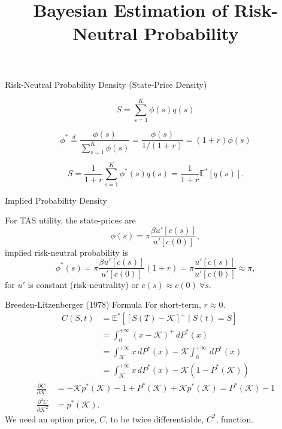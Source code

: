 \documentclass[10pt,aspectratio=43]{beamer}
\title{Bayesian Estimation of Risk-Neutral Probability}
\begin{document}
\begin{frame}[fragile]
    \titlepage
\end{frame}




\begin{frame}{ Risk-Neutral Probability Density (State-Price Density)}

    \[S=\sum_{s=1}^K\phi(s)q(s)\]

    \[\phi^*\overset{d}{=}\frac{\phi(s)}{\sum_{s=1}^K\phi(s)}=\frac{\phi(s)}{1/(1+r)}=(1+r)\phi(s)\]

    \[S=\frac{1}{1+r}\sum_{s=1}^K\phi^*(s)q(s)=\frac{1}{1+r}\mathbb{E}^*[q(s)].\]

\end{frame}
\begin{frame}{Implied  Probability Density}
 
    For TAS utility, the state-prices are 
    \[\phi(s)=\pi\frac{\beta u'[c(s)]}{u'[c(0)]},\]
    \then implied risk-neutral probability is
    \[\phi^*(s)=\pi\frac{\beta u'[c(s)]}{u'[c(0)]}(1+r)= \pi\frac{u'[c(s)]}{u'[c(0)]}\approx \pi,\]
    for $u'$ is constant (risk-neutrality) or $c(s)\approx c(0)~\forall s$.


\end{frame}

\begin{frame}{Breeden-Litzenberger (1978) Formula}
\nocite{breedenPricesStateContingentClaims1978}
For short-term, $r\approx 0$.
    \begin{align*}
        C(S,t)&=\mathbb{E}^*\left[[S(T)-\mathcal{K}]^+\mid S(t)=S\right]\\ 
        &=\int_0^{+\infty}(x-\mathcal{K})^+\,dP^*(x)\\ &=\int_{\mathcal{K}}^{+\infty}x\,dP^*(x)-\mathcal{K}\int_0^{+\infty}\,dP^*(x)\\ 
        &=\int_{\mathcal{K}}^{+\infty}x\,dP^*(x)-\mathcal{K}(1-P^*(\mathcal{K}))
    \end{align*}
    \begin{align*}
        \frac{\partial C}{\partial \mathcal{K}}&=-\mathcal{K}p^*(\mathcal{K})-1+P^*(\mathcal{K})+\mathcal{K}p^*(\mathcal{K})=P^*(\mathcal{K})-1\\ 
        \frac{\partial^2 C}{\partial \mathcal{K}^2}&=p^*(\mathcal{K}).
    \end{align*}
   We need an option price, $C$, to be twice differentiable, $C^2$, function. 
\end{frame}
\end{document}
